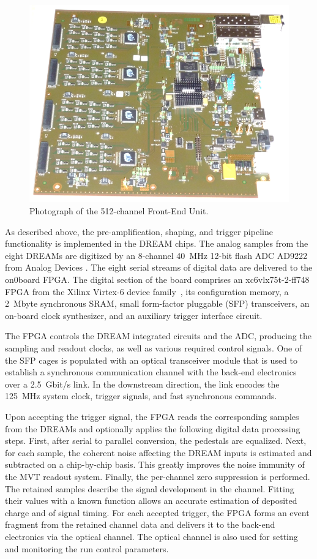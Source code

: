 \begin{figure}[htb]
 \includegraphics[width=1.0\columnwidth,keepaspectratio]{images/electronics_fig3.png}
 \caption{Photograph of the 512-channel Front-End Unit.}
 \label{fig:mm-e_3}
\end{figure}

As described above, the pre-amplification, shaping, and trigger pipeline functionality is implemented in the DREAM chips. The
analog samples from the eight DREAMs are digitized by an 8-channel 40~MHz 12-bit flash ADC AD9222 from Analog Devices
\cite{ADC}. The eight serial streams of digital data are delivered to the on0board FPGA. The digital section of the board
comprises an xc6vlx75t-2-ff748 FPGA from the Xilinx Virtex-6 device family~\cite{XIL}, its configuration memory, a 2~Mbyte
synchronous SRAM, small form-factor pluggable (SFP) transceivers, an on-board clock synthesizer, and an auxiliary trigger
interface circuit.

The FPGA controls the DREAM integrated circuits and the ADC, producing the sampling and readout clocks, as well as various
required control signals. One of the SFP cages is populated with an optical transceiver module that is used to establish a
synchronous communication channel with the back-end electronics over a 2.5~Gbit/s link. In the downstream direction, the link
encodes the 125~MHz system clock, trigger signals, and fast synchronous commands.

Upon accepting the trigger signal, the FPGA reads the corresponding samples from the DREAMs and optionally applies the
following digital data processing steps. First, after serial to parallel conversion, the pedestals are equalized. Next, for each
sample, the coherent noise affecting the DREAM inputs is estimated and subtracted on a chip-by-chip basis. This greatly
improves the noise immunity of the MVT readout system. Finally, the per-channel zero suppression is performed. The retained
samples describe the signal development in the channel. Fitting their values with a known function allows an accurate estimation of
deposited charge and of signal timing. For each accepted trigger, the FPGA forms an event fragment from the retained channel
data and delivers it to the back-end electronics via the optical channel. The optical channel is also used for setting and monitoring
the run control parameters.

